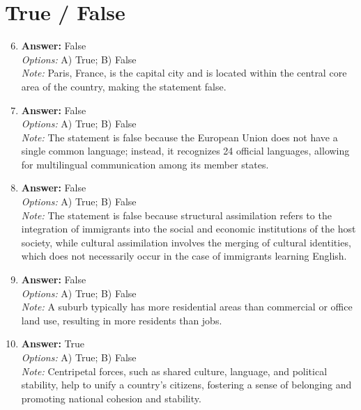 \documentclass[12pt]{article}
\begin{document}
\section*{True / False}
\begin{enumerate}[label=\arabic*.]
\setcounter{enumi}{5}
\item \textbf{Answer:} False
\\ \textit{Options:} A) True; B) False
\\ \textit{Note:} Paris, France, is the capital city and is located within the central core area of the country, making the statement false.
\item \textbf{Answer:} False
\\ \textit{Options:} A) True; B) False
\\ \textit{Note:} The statement is false because the European Union does not have a single common language; instead, it recognizes 24 official languages, allowing for multilingual communication among its member states.
\item \textbf{Answer:} False
\\ \textit{Options:} A) True; B) False
\\ \textit{Note:} The statement is false because structural assimilation refers to the integration of immigrants into the social and economic institutions of the host society, while cultural assimilation involves the merging of cultural identities, which does not necessarily occur in the case of immigrants learning English.
\item \textbf{Answer:} False
\\ \textit{Options:} A) True; B) False
\\ \textit{Note:} A suburb typically has more residential areas than commercial or office land use, resulting in more residents than jobs.
\item \textbf{Answer:} True
\\ \textit{Options:} A) True; B) False
\\ \textit{Note:} Centripetal forces, such as shared culture, language, and political stability, help to unify a country's citizens, fostering a sense of belonging and promoting national cohesion and stability.
\end{enumerate}
\end{document}

